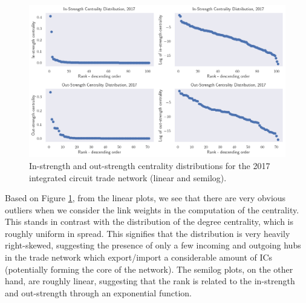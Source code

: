 \documentclass[12pt,letterpaper]{report}
\begin{document}
			\begin{figure}[!h]
				\centering
				\includegraphics[width=\textwidth]{Fig508-StrengthDistribution.png}
				\caption{In-strength and out-strength centrality distributions for the 2017 integrated circuit trade network (linear and semilog).}\label{fig:508StrengthDistribution}
			\end{figure}
			
			Based on Figure \ref{fig:508StrengthDistribution}, from the linear plots, we see that there are very obvious outliers when we consider the link weights in the computation of the centrality. This stands in contrast with the distribution of the degree centrality, which is roughly uniform in spread. This signifies that the distribution is very heavily right-skewed, suggesting the presence of only a few incoming and outgoing hubs in the trade network which export/import a considerable amount of ICs (potentially forming the core of the network). The semilog plots, on the other hand, are roughly linear, suggesting that the rank is related to the in-strength and out-strength through an exponential function.
			
\end{document}
